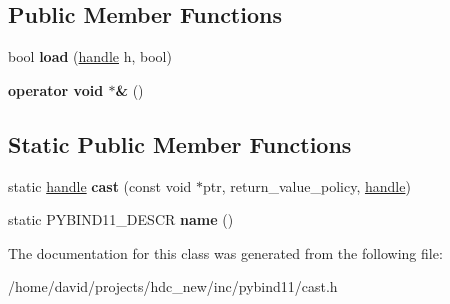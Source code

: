 \subsection*{Public Member Functions}
\begin{DoxyCompactItemize}
\item 
bool {\bfseries load} (\hyperlink{classhandle}{handle} h, bool)\hypertarget{classtype__caster_3_01void_01_4_a0059efa286541d97ac65bb84cd22b93d}{}\label{classtype__caster_3_01void_01_4_a0059efa286541d97ac65bb84cd22b93d}

\item 
{\bfseries operator void $\ast$\&} ()\hypertarget{classtype__caster_3_01void_01_4_adc394a95bcc81e382ac81ad44039a072}{}\label{classtype__caster_3_01void_01_4_adc394a95bcc81e382ac81ad44039a072}

\end{DoxyCompactItemize}
\subsection*{Static Public Member Functions}
\begin{DoxyCompactItemize}
\item 
static \hyperlink{classhandle}{handle} {\bfseries cast} (const void $\ast$ptr, return\+\_\+value\+\_\+policy, \hyperlink{classhandle}{handle})\hypertarget{classtype__caster_3_01void_01_4_a70b8f85942ed923f69e16fb949c22ea6}{}\label{classtype__caster_3_01void_01_4_a70b8f85942ed923f69e16fb949c22ea6}

\item 
static P\+Y\+B\+I\+N\+D11\+\_\+\+D\+E\+S\+CR {\bfseries name} ()\hypertarget{classtype__caster_3_01void_01_4_ae0198e8f6a0d4c86cfecba19e039c45b}{}\label{classtype__caster_3_01void_01_4_ae0198e8f6a0d4c86cfecba19e039c45b}

\end{DoxyCompactItemize}


The documentation for this class was generated from the following file\+:\begin{DoxyCompactItemize}
\item 
/home/david/projects/hdc\+\_\+new/inc/pybind11/cast.\+h\end{DoxyCompactItemize}
